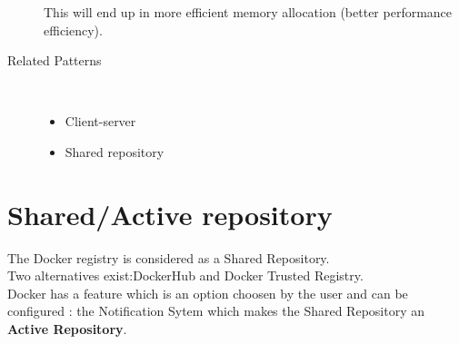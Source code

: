 \begin{description}
This will end up in more efficient memory allocation (better performance efficiency).

\item [Related Patterns]~
\begin{itemize}
	\item Client-server
	\item Shared repository
\end{itemize}
\end{description}



\section{Shared/Active repository}

The Docker registry is considered as a Shared Repository. \\
Two alternatives exist:DockerHub and Docker Trusted Registry. \\
Docker has a feature which is an option choosen by the user and can be configured : the Notification Sytem \cite{docknotif} which makes the Shared Repository an \textbf{Active Repository}.


